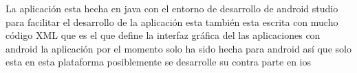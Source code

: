 La aplicación esta hecha en java con el entorno de desarrollo de android studio para facilitar el desarrollo de la aplicación esta también esta escrita con mucho código XML que es el que define la interfaz gráfica del las aplicaciones con android la aplicación por el momento solo ha sido hecha para android así que solo esta en esta plataforma posiblemente se desarrolle su contra parte en ios